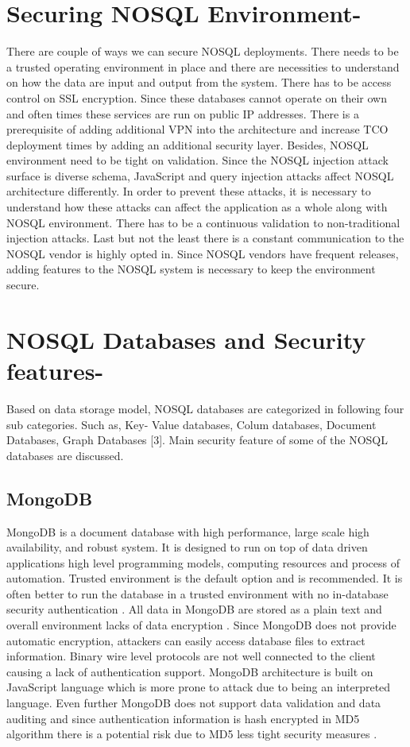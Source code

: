 \documentclass[sigconf]{acmart}
\begin{document}
\section{Securing NOSQL Environment-} There are couple of ways we can secure NOSQL deployments. There needs to be a trusted operating environment in place and there are necessities to understand on how the data are input and output from the system. There has to be access control on SSL encryption. Since these databases cannot operate on their own and often times these services are run on public IP addresses. There is a prerequisite of adding additional VPN into the architecture and increase TCO deployment times by adding an additional security layer. Besides, NOSQL environment need to be tight on validation. Since the NOSQL injection attack surface is diverse schema, JavaScript and query injection attacks affect NOSQL architecture differently. In order to prevent these attacks, it is necessary to understand how these attacks can affect the application as a whole along with NOSQL environment. There has to be a continuous validation to non-traditional injection attacks. Last but not the least there is a constant communication to the NOSQL vendor is highly opted in. Since NOSQL vendors have frequent releases, adding features to the NOSQL system is necessary to keep the environment secure.

\section{NOSQL Databases and Security features-} Based on data storage model, NOSQL databases are categorized in following four sub categories. Such as, Key- Value databases, Colum databases, Document Databases, Graph Databases [3]. Main security feature of some of the NOSQL databases are discussed.

\subsection{MongoDB}
MongoDB is a document database with high performance, large scale high availability, and robust system. It is designed to run on top of data driven applications high level programming models, computing resources and process of automation. Trusted environment is the default option and is recommended. It is often better to run the database in a trusted environment with no in-database security authentication \cite{editor03} . All data in MongoDB are stored as a plain text and overall environment lacks of data encryption \cite{editor03}. Since MongoDB does not provide automatic encryption, attackers can easily access database files to extract information. Binary wire level protocols are not well connected to the client causing a lack of authentication support. MongoDB architecture is built on JavaScript language which is more prone to attack due to being an interpreted language. Even further MongoDB does not support data validation and data auditing and since authentication information is hash encrypted in MD5 algorithm there is a potential risk due to MD5 less tight security measures \cite{editor05}.
\end{document}
